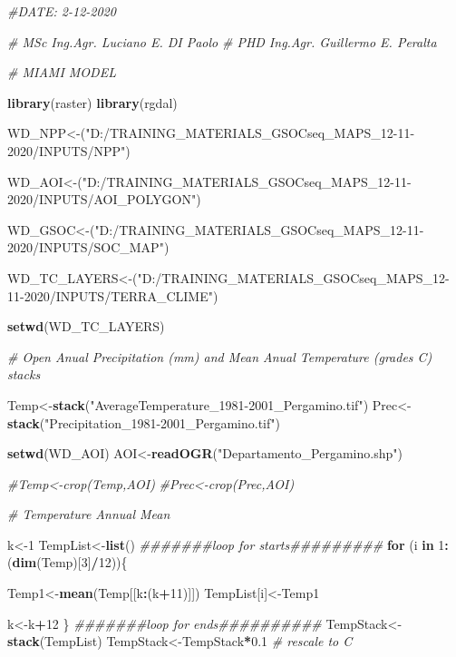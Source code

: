 \documentclass[
  10pt,
  b5paper,
]{book}
\newenvironment{Shaded}{\begin{snugshade}}{\end{snugshade}}
\newcommand{\CommentTok}[1]{\textcolor[rgb]{0.56,0.35,0.01}{\textit{#1}}}
\newcommand{\ControlFlowTok}[1]{\textcolor[rgb]{0.13,0.29,0.53}{\textbf{#1}}}
\newcommand{\DecValTok}[1]{\textcolor[rgb]{0.00,0.00,0.81}{#1}}
\newcommand{\FloatTok}[1]{\textcolor[rgb]{0.00,0.00,0.81}{#1}}
\newcommand{\KeywordTok}[1]{\textcolor[rgb]{0.13,0.29,0.53}{\textbf{#1}}}
\newcommand{\NormalTok}[1]{#1}
\newcommand{\OperatorTok}[1]{\textcolor[rgb]{0.81,0.36,0.00}{\textbf{#1}}}
\newcommand{\StringTok}[1]{\textcolor[rgb]{0.31,0.60,0.02}{#1}}
\begin{document}
\begin{Shaded}
\begin{Highlighting}[]
\CommentTok{#DATE: 2-12-2020}

\CommentTok{# MSc Ing.Agr. Luciano E. DI Paolo}
\CommentTok{# PHD Ing.Agr. Guillermo E. Peralta}


\CommentTok{# MIAMI MODEL}

\KeywordTok{library}\NormalTok{(raster)}
\KeywordTok{library}\NormalTok{(rgdal)}

\NormalTok{WD_NPP<-(}\StringTok{"D:/TRAINING_MATERIALS_GSOCseq_MAPS_12-11-2020/INPUTS/NPP"}\NormalTok{)}

\NormalTok{WD_AOI<-(}\StringTok{"D:/TRAINING_MATERIALS_GSOCseq_MAPS_12-11-2020/INPUTS/AOI_POLYGON"}\NormalTok{)}

\NormalTok{WD_GSOC<-(}\StringTok{"D:/TRAINING_MATERIALS_GSOCseq_MAPS_12-11-2020/INPUTS/SOC_MAP"}\NormalTok{)}

\NormalTok{WD_TC_LAYERS<-(}\StringTok{"D:/TRAINING_MATERIALS_GSOCseq_MAPS_12-11-2020/INPUTS/TERRA_CLIME"}\NormalTok{)}

\KeywordTok{setwd}\NormalTok{(WD_TC_LAYERS)}

\CommentTok{# Open Anual Precipitation (mm) and Mean Anual Temperature (grades C) stacks}

\NormalTok{Temp<-}\KeywordTok{stack}\NormalTok{(}\StringTok{"AverageTemperature_1981-2001_Pergamino.tif"}\NormalTok{)}
\NormalTok{Prec<-}\KeywordTok{stack}\NormalTok{(}\StringTok{"Precipitation_1981-2001_Pergamino.tif"}\NormalTok{)}

\KeywordTok{setwd}\NormalTok{(WD_AOI)}
\NormalTok{AOI<-}\KeywordTok{readOGR}\NormalTok{(}\StringTok{"Departamento_Pergamino.shp"}\NormalTok{)}

\CommentTok{#Temp<-crop(Temp,AOI)}
\CommentTok{#Prec<-crop(Prec,AOI)}

\CommentTok{# Temperature Annual Mean }

\NormalTok{k<-}\DecValTok{1}
\NormalTok{TempList<-}\KeywordTok{list}\NormalTok{()}
\CommentTok{#######loop for starts#########}
\ControlFlowTok{for}\NormalTok{ (i }\ControlFlowTok{in} \DecValTok{1}\OperatorTok{:}\NormalTok{(}\KeywordTok{dim}\NormalTok{(Temp)[}\DecValTok{3}\NormalTok{]}\OperatorTok{/}\DecValTok{12}\NormalTok{))\{}

\NormalTok{Temp1<-}\KeywordTok{mean}\NormalTok{(Temp[[k}\OperatorTok{:}\NormalTok{(k}\OperatorTok{+}\DecValTok{11}\NormalTok{)]])}
\NormalTok{TempList[i]<-Temp1}

\NormalTok{k<-k}\OperatorTok{+}\DecValTok{12}
\NormalTok{\}}
\CommentTok{#######loop for ends##########}
\NormalTok{TempStack<-}\KeywordTok{stack}\NormalTok{(TempList)}
\NormalTok{TempStack<-TempStack}\OperatorTok{*}\FloatTok{0.1} \CommentTok{# rescale to C}


\end{Highlighting}
\end{Shaded}
\end{document}

